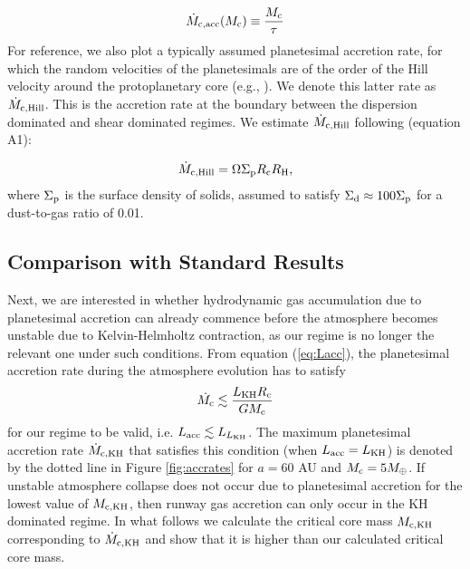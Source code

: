 \documentclass[apj]{emulateapj}
\newcommand{\co}{_{\rm c}}
\newcommand{\di}{_{\rm d}}
\begin{document}
\begin{equation}
\label{eq:Mcdot}
\dot{M}_{\rm{c,acc}}(M_{\rm{c}}) \equiv \frac{M_{\rm{c}}}{\tau}
\end{equation}
For reference, we also plot a typically assumed planetesimal accretion rate, for which the random velocities of the planetesimals are of the order of the Hill velocity around the protoplanetary core (e.g., \citealt{goldreich04}). We denote this latter rate as $\dot{M}_{\rm{c,Hill}}$. This is the accretion rate at the boundary between the dispersion dominated and shear dominated regimes. We estimate $\dot{M}_{\rm{c,Hill}}$ following \citet{rafikov06} (equation A1):

\begin{equation}
\label{eq:MdotHill}
\dot{M}_{\rm{c,Hill}}=\Omega \Sigma_{\rm p} R\co R_{\rm H},
\end{equation}
where $\Sigma_{\rm p}$ is the surface density of solids, assumed to satisfy $\Sigma\di \approx 100 \Sigma_{\rm p}$ for a dust-to-gas ratio of 0.01.



\subsection{Comparison with Standard Results}
\label{raf2}

Next, we are interested in whether hydrodynamic gas accumulation due to planetesimal accretion can already commence before the atmosphere becomes unstable due to Kelvin-Helmholtz contraction, as our regime is no longer the relevant one under such conditions. From equation (\ref{eq:Lacc}), the planetesimal accretion rate during the atmosphere evolution has to satisfy
\begin{equation}
\label{eq:McdotKH}
\dot{M\co} \lesssim \frac{L_{\rm KH} R\co}{G M\co}
\end{equation}
for our regime to be valid, i.e. $L_{\rm acc} \lesssim L_{L_{\rm KH}}$. The maximum planetesimal accretion rate $\dot{M}_{\rm c, KH}$ that satisfies this condition (when $L_{\rm acc}=L_{\rm KH}$) is denoted by the dotted line in Figure \ref{fig:accrates} for $a=60$ AU and $M\co=5M_{\oplus}$. If unstable atmosphere collapse does not occur due to planetesimal accretion for the lowest value of $M_{\rm c, KH}$, then runway gas accretion can only occur in the KH dominated regime. In what follows we calculate the critical core mass $M_{\rm c, KH}$ corresponding to $\dot{M}_{\rm c, KH}$ and show that it is higher than our calculated critical core mass. 
\end{document}
